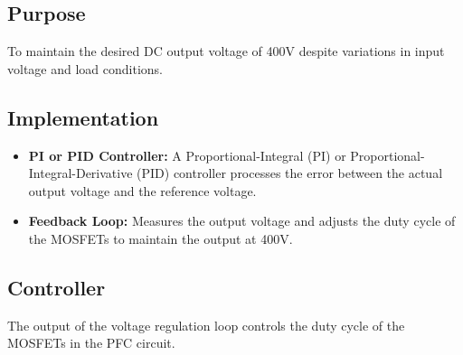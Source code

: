 \documentclass{article}
\begin{document}
\subsection{Purpose}
To maintain the desired DC output voltage of 400V despite variations in input voltage and load conditions.

\subsection{Implementation}
\begin{itemize}
    \item \textbf{PI or PID Controller:} A Proportional-Integral (PI) or Proportional-Integral-Derivative (PID) controller processes the error between the actual output voltage and the reference voltage.
    \item \textbf{Feedback Loop:} Measures the output voltage and adjusts the duty cycle of the MOSFETs to maintain the output at 400V.
\end{itemize}

\subsection{Controller}
The output of the voltage regulation loop controls the duty cycle of the MOSFETs in the PFC circuit.
\end{document}
